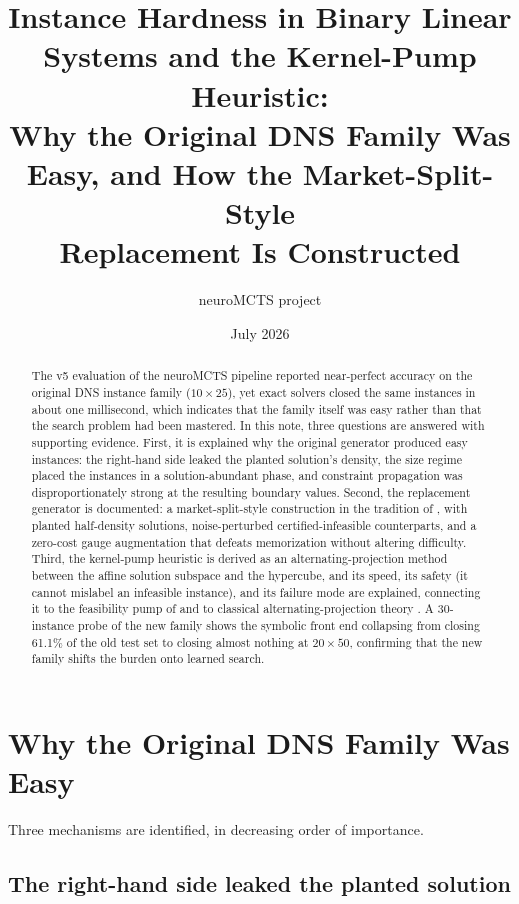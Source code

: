 \documentclass[12pt]{article}
\title{Instance Hardness in Binary Linear Systems and the Kernel-Pump Heuristic:\\
Why the Original DNS Family Was Easy, and How the Market-Split-Style\\
Replacement Is Constructed}
\author{neuroMCTS project}
\date{July 2026}
\begin{document}
\maketitle

\begin{abstract}
The v5 evaluation of the neuroMCTS pipeline reported near-perfect accuracy on the original DNS instance family ($10 \times 25$), yet exact solvers closed the same instances in about one millisecond, which indicates that the family itself was easy rather than that the search problem had been mastered. In this note, three questions are answered with supporting evidence. First, it is explained why the original generator produced easy instances: the right-hand side leaked the planted solution's density, the size regime placed the instances in a solution-abundant phase, and constraint propagation was disproportionately strong at the resulting boundary values. Second, the replacement generator is documented: a market-split-style construction in the tradition of \citet{cornuejols1998market}, with planted half-density solutions, noise-perturbed certified-infeasible counterparts, and a zero-cost gauge augmentation that defeats memorization without altering difficulty. Third, the kernel-pump heuristic is derived as an alternating-projection method between the affine solution subspace and the hypercube, and its speed, its safety (it cannot mislabel an infeasible instance), and its failure mode are explained, connecting it to the feasibility pump of \citet{fischetti2005feasibility} and to classical alternating-projection theory \citep{bauschke1996projection}. A 30-instance probe of the new family shows the symbolic front end collapsing from closing 61.1\% of the old test set to closing almost nothing at $20 \times 50$, confirming that the new family shifts the burden onto learned search.
\end{abstract}

\section{Why the Original DNS Family Was Easy}
\label{sec:easy}

Three mechanisms are identified, in decreasing order of importance.

\subsection{The right-hand side leaked the planted solution}
\end{document}
